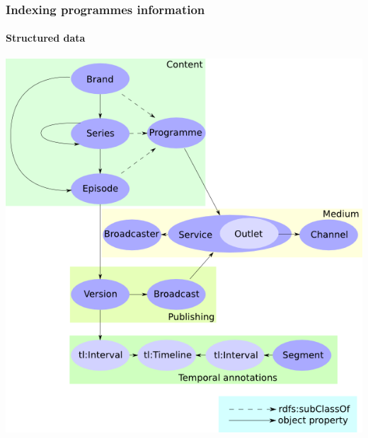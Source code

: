 \documentclass{beamer}
\begin{document}
\begin{frame}
  \frametitle{Indexing programmes information}
  \framesubtitle{Structured data}
  \centering
  \includegraphics[width=\linewidth]{programmes_ontology.png}
\end{frame}
\end{document}
